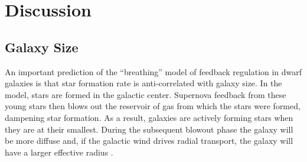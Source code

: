 \documentclass[iop]{emulateapj}
\begin{document}






\section{Discussion}
\label{(sec:discuss)}


\subsection{Galaxy Size}

An important prediction of the ``breathing'' model of feedback regulation in dwarf galaxies is that star formation rate is anti-correlated with galaxy size. In the model, stars are formed in the galactic center. Supernova feedback from these young stars then blows out the reservoir of gas from which the stars were formed, dampening star formation. As a result, galaxies are actively forming stars when they are at their smallest. During the subsequent blowout phase the galaxy will be more diffuse and, if the galactic wind drives radial transport, the galaxy will have a larger effective radius \citep{EB17}. 
\end{document}
